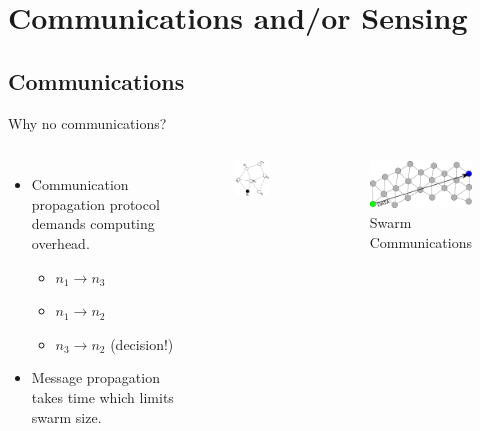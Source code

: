 \documentclass{beamer}
\begin{document}
\section{Communications and/or Sensing}
\subsection{Communications}
\begin{frame}{Why no communications?}
  
  \begin{columns}
      \begin{itemize}
        \item {
          Communication propagation protocol demands computing overhead.
          \begin{itemize}
            \item $n_1 \rightarrow n_3$
            \item $n_1 \rightarrow n_2$
            \item $n_3 \rightarrow n_2$ (decision!) 
          \end{itemize}
        }
        \item {   
          Message propagation takes time which limits swarm size.
        }
      \end{itemize}
      \begin{figure}
        \begin{center}
          \includegraphics[width=2.5cm]{MessagePropogation1.pdf}
        \end{center}
      \end{figure}
      \begin{figure}
        \begin{center}
          \includegraphics[width=4cm]{Comms1.pdf}
        \end{center}
        \caption{Swarm Communications}
      \end{figure}
    \end{columns}
\end{frame}
\end{document}
